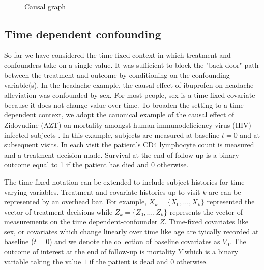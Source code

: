 \documentclass[11pt]{article}
\begin{document}
    \begin{figure}
\caption{Causal graph}
\end{figure}

    \subsection{Time dependent
confounding}\label{time-dependent-confounding}

So far we have considered the time fixed context in which treatment and
confounders take on a single value. It was sufficient to block the "back
door" path between the treatment and outcome by conditioning on the
confounding variable(s). In the headache example, the causal effect of
ibuprofen on headache alleviation was confounded by sex. For most
people, sex is a time-fixed covariate because it does not change value
over time. To broaden the setting to a time dependent context, we adopt
the canonical example of the causal effect of Zidovudine (AZT) on
mortality amongst human immunodeficiency virus (HIV)-infected subjects
\citet{Hernan2000}. In this example, subjects are measured at baseline
\(t = 0\) and at subsequent visits. In each visit the patient's CD4
lymphocyte count is measured and a treatment decision made. Survival at
the end of follow-up is a binary outcome equal to 1 if the patient has
died and 0 otherwise. \linebreak

The time-fixed notation can be extended to include subject histories for
time varying variables. Treatment and covariate histories up to visit
\(k\) are can be represented by an overhead bar. For example,
\(\bar X_{k} = \{X_{0}, \hdots, X_{k}\}\) represented the vector of
treatment decisions while \(\bar Z_{k} = \{Z_{0}, \hdots, Z_{k}\}\)
represents the vector of measurements on the time dependent-confounder
\(Z\). Time-fixed covariates like sex, or covariates which change
linearly over time like age are tyically recorded at baseline
(\(t = 0\)) and we denote the collection of baseline covariates as
\(V_{0}\). The outcome of interest at the end of follow-up is mortality
\(Y\) which is a binary variable taking the value \(1\) if the patient
is dead and \(0\) otherwise. \linebreak 
\end{document}
